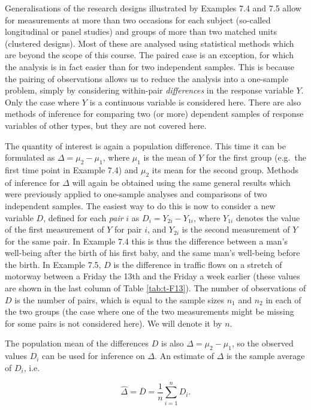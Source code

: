 \documentclass[11pt,a4paper,openany]{book}
\begin{document}
Generalisations of the research designs illustrated by Examples 7.4 and
7.5 allow for measurements at more than two occasions for each subject
(so-called longitudinal or panel studies) and groups of more than two
matched units (clustered designs). Most of these are analysed using
statistical methods which are beyond the scope of this course. The
paired case is an exception, for which the analysis is in fact easier
than for two independent samples. This is because the pairing of
observations allows us to reduce the analysis into a one-sample problem,
simply by considering within-pair \emph{differences} in the response
variable \(Y\). Only the case where \(Y\) is a continuous variable is
considered here. There are also methods of inference for comparing two
(or more) dependent samples of response variables of other types, but
they are not covered here.

The quantity of interest is again a population difference. This time it
can be formulated as \(\Delta=\mu_{2}-\mu_{1}\), where \(\mu_{1}\) is
the mean of \(Y\) for the first group (e.g.~the first time point in
Example 7.4) and \(\mu_{2}\) its mean for the second group. Methods of
inference for \(\Delta\) will again be obtained using the same general
results which were previously applied to one-sample analyses and
comparisons of two independent samples. The easiest way to do this is
now to consider a new variable \(D\), defined for each \emph{pair} \(i\)
as \(D_{i}=Y_{2i}-Y_{1i}\), where \(Y_{1i}\) denotes the value of the
first measurement of \(Y\) for pair \(i\), and \(Y_{2i}\) is the second
measurement of \(Y\) for the same pair. In Example 7.4 this is thus the
difference between a man's well-being after the birth of his first baby,
and the same man's well-being before the birth. In Example 7.5, \(D\) is
the difference in traffic flows on a stretch of motorway between a
Friday the 13th and the Friday a week earlier (these values are shown in
the last column of Table \ref{tab:t-F13}). The number of observations of
\(D\) is the number of pairs, which is equal to the sample sizes
\(n_{1}\) and \(n_{2}\) in each of the two groups (the case where one of
the two measurements might be missing for some pairs is not considered
here). We will denote it by \(n\).

The population mean of the differences \(D\) is also
\(\Delta=\mu_{2}-\mu_{1}\), so the observed values \(D_{i}\) can be used
for inference on \(\Delta\). An estimate of \(\Delta\) is the sample
average of \(D_{i}\), i.e.

\begin{equation}\hat{\Delta}=\overline{D}=\frac{1}{n}\sum_{i=1}^{n} D_{i}.
\label{eq:Dbar-dep}\end{equation}
\end{document}
